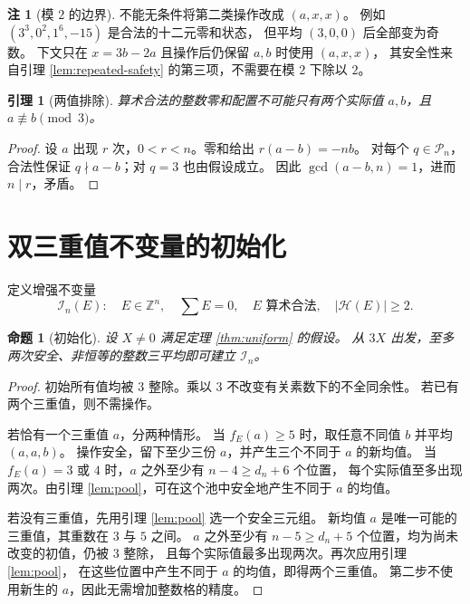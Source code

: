 \documentclass[UTF8,fontset=fandol,zihao=-4,a4paper]{ctexart}
\numberwithin{equation}{section}
\newtheorem{lemma}[theorem]{引理}
\newtheorem{proposition}[theorem]{命题}
\theoremstyle{definition}
\newtheorem{remark}[theorem]{注}
\newcommand{\Z}{\mathbb Z}
\newcommand{\PP}{\mathcal P}
\newcommand{\HH}{\mathcal H}
\newcommand{\II}{\mathcal I}
\begin{document}
\begin{remark}[模 $2$ 的边界]\label{rem:two}
不能无条件将第二类操作改成 $(a,x,x)$。
例如 $(3^3,0^2,1^6,-15)$ 是合法的十二元零和状态，
但平均 $(3,0,0)$ 后全部变为奇数。
下文只在 $x=3b-2a$ 且操作后仍保留 $a,b$ 时使用 $(a,x,x)$，
其安全性来自引理 \ref{lem:repeated-safety} 的第三项，不需要在模 $2$ 下除以 $2$。
\end{remark}

\begin{lemma}[两值排除]\label{lem:two-values}
算术合法的整数零和配置不可能只有两个实际值 $a,b$，且 $a\not\equiv b\pmod3$。
\end{lemma}
\begin{proof}
设 $a$ 出现 $r$ 次，$0<r<n$。零和给出 $r(a-b)=-nb$。
对每个 $q\in\PP_n$，合法性保证 $q\nmid a-b$；对 $q=3$ 也由假设成立。
因此 $\gcd(a-b,n)=1$，进而 $n\mid r$，矛盾。
\end{proof}

\section{双三重值不变量的初始化}\label{sec:initialization}

定义增强不变量
\begin{equation}\label{eq:invariant}
 \II_n(E):\quad E\in\Z^n,\quad\sum E=0,\quad
 E\text{ 算术合法},\quad |\HH(E)|\ge2.
\end{equation}

\begin{proposition}[初始化]\label{prop:initialization}
设 $X\ne0$ 满足定理 \ref{thm:uniform} 的假设。
从 $3X$ 出发，至多两次安全、非恒等的整数三平均即可建立 $\II_n$。
\end{proposition}
\begin{proof}
初始所有值均被 $3$ 整除。乘以 $3$ 不改变有关素数下的不全同余性。
若已有两个三重值，则不需操作。

若恰有一个三重值 $a$，分两种情形。
当 $f_E(a)\ge5$ 时，取任意不同值 $b$ 并平均 $(a,a,b)$。
操作安全，留下至少三份 $a$，并产生三个不同于 $a$ 的新均值。
当 $f_E(a)=3$ 或 $4$ 时，$a$ 之外至少有 $n-4\ge d_n+6$ 个位置，
每个实际值至多出现两次。由引理 \ref{lem:pool}，可在这个池中安全地产生不同于 $a$ 的均值。

若没有三重值，先用引理 \ref{lem:pool} 选一个安全三元组。
新均值 $a$ 是唯一可能的三重值，其重数在 $3$ 与 $5$ 之间。
$a$ 之外至少有 $n-5\ge d_n+5$ 个位置，均为尚未改变的初值，仍被 $3$ 整除，
且每个实际值最多出现两次。再次应用引理 \ref{lem:pool}，
在这些位置中产生不同于 $a$ 的均值，即得两个三重值。
第二步不使用新生的 $a$，因此无需增加整数格的精度。
\end{proof}
\end{document}

